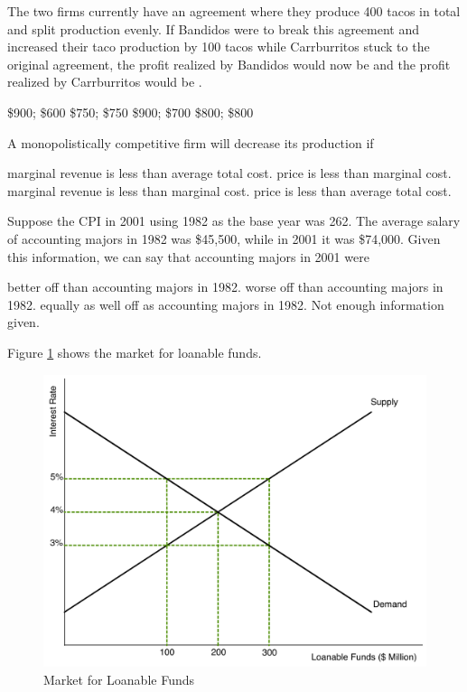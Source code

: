 \documentclass[addpoints,11pt]{exam}
\theoremstyle{definition}
\newcommand{\blank}[0]{\underline{\hspace{3cm}}}
\begin{document}
\begin{questions}
	The two firms currently have an agreement where they produce 400 tacos in total and split production evenly. If Bandidos were to break this agreement and increased their taco production by 100 tacos while Carrburritos stuck to the original agreement, the profit realized by Bandidos would now be \underline{\hspace{3cm}} and the profit realized by Carrburritos would be \blank.
	
	
	\begin{choices}
		\CorrectChoice \$900; \$600
		\choice \$750; \$750
		\choice \$900; \$700
		\choice \$800; \$800
	\end{choices} 
	

	\question A monopolistically competitive firm will decrease its production if
	
	\begin{choices}
		\choice marginal revenue is less than average total cost.
		\choice price is less than marginal cost.
		\CorrectChoice marginal revenue is less than marginal cost.
		\choice price is less than average total cost.
	\end{choices}	

\newpage
	
	\question Suppose the CPI in 2001 using 1982 as the base year was 262. The average salary of accounting majors in 1982 was \$45,500, while in 2001 it was \$74,000. Given this information, we can say that accounting majors in 2001 were
	
	\begin{choices}
		\choice better off than accounting majors in 1982.
		\CorrectChoice worse off than accounting majors in 1982.
		\choice equally as well off as accounting majors in 1982.
		\choice Not enough information given.
	\end{choices}
	
	
	\question Figure \ref{MC27} shows the market for loanable funds. 
	
	
	\begin{figure}[H]
		\centering
		\includegraphics[scale=.4]{Exam2_MC27.pdf}
		\caption{Market for Loanable Funds}
		\label{MC27}
	\end{figure}
	

\end{questions}
\end{document}
